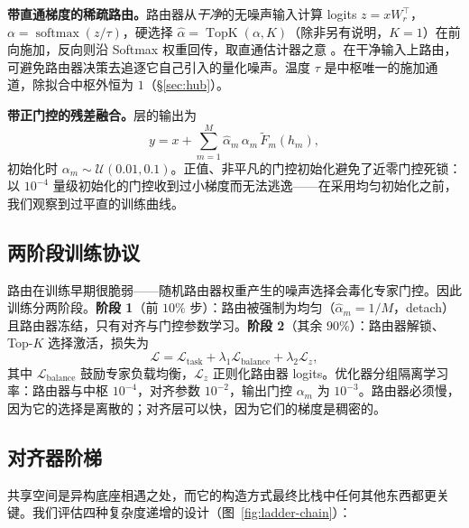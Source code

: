 \documentclass[10pt,twoside]{article}
\newcommand{\topk}{\operatorname{TopK}}
\newcommand{\softmax}{\operatorname{softmax}}
\theoremstyle{definition}
\theoremstyle{plain}
\theoremstyle{remark}
\begin{document}
\textbf{带直通梯度的稀疏路由。}路由器从\emph{干净}的无噪声输入计算 logits $z = x W_r^\top$，$\alpha = \softmax(z/\tau)$，硬选择 $\hat\alpha = \topk(\alpha, K)$（除非另有说明，$K{=}1$）在前向施加，反向则沿 Softmax 权重回传，取直通估计器之意 \citep{bengio2013}。在干净输入上路由，可避免路由器决策去追逐它自己引入的量化噪声。温度 $\tau$ 是中枢唯一的施加通道，除拟合中枢外恒为 $1$（\S\ref{sec:hub}）。

\textbf{带正门控的残差融合。}层的输出为
\begin{equation}
\label{eq:fuse}
y = x + \sum_{m=1}^{M} \hat\alpha_m \, \alpha_m \, \tilde F_m(h_m),
\end{equation}
初始化时 $\alpha_m \sim \mathcal{U}(0.01, 0.1)$。正值、非平凡的门控初始化避免了近零门控死锁：以 $10^{-4}$ 量级初始化的门控收到过小梯度而无法逃逸——在采用均匀初始化之前，我们观察到过平直的训练曲线。

\subsection{两阶段训练协议}
\label{sec:training}

路由在训练早期很脆弱——随机路由器权重产生的噪声选择会毒化专家门控。因此训练分两阶段。\textbf{阶段 1}（前 $10\%$ 步）：路由被强制为均匀（$\hat\alpha_m = 1/M$，detach）且路由器冻结，只有对齐与门控参数学习。\textbf{阶段 2}（其余 $90\%$）：路由器解锁、Top-$K$ 选择激活，损失为
\begin{equation}
\label{eq:loss}
\mathcal{L} = \mathcal{L}_{\text{task}} + \lambda_1 \mathcal{L}_{\text{balance}} + \lambda_2 \mathcal{L}_{z},
\end{equation}
其中 $\mathcal{L}_{\text{balance}}$ 鼓励专家负载均衡，$\mathcal{L}_{z}$ 正则化路由器 logits。优化器分组隔离学习率：路由器与中枢 $10^{-4}$，对齐参数 $10^{-2}$，输出门控 $\alpha_m$ 为 $10^{-3}$。路由器必须慢，因为它的选择是离散的；对齐层可以快，因为它们的梯度是稠密的。

\subsection{对齐器阶梯}
\label{sec:align}

共享空间是异构底座相遇之处，而它的构造方式最终比栈中任何其他东西都更关键。我们评估四种复杂度递增的设计（图~\ref{fig:ladder-chain}）：
\end{document}
